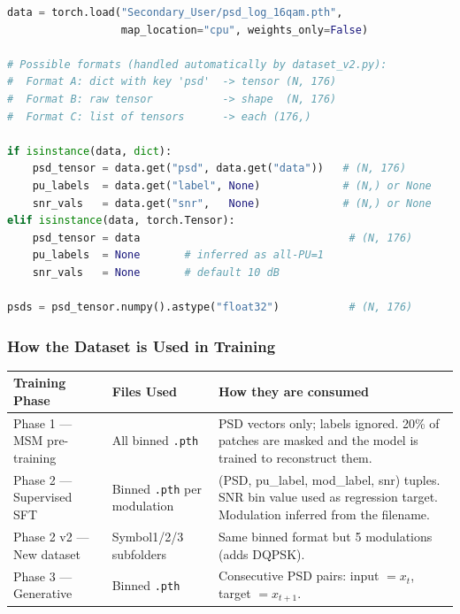 \documentclass[11pt,a4paper]{article}
\begin{document}
\begin{lstlisting}[language=Python, caption=Loading a log-scale .pth file]
data = torch.load("Secondary_User/psd_log_16qam.pth",
                  map_location="cpu", weights_only=False)

# Possible formats (handled automatically by dataset_v2.py):
#  Format A: dict with key 'psd'  -> tensor (N, 176)
#  Format B: raw tensor           -> shape  (N, 176)
#  Format C: list of tensors      -> each (176,)

if isinstance(data, dict):
    psd_tensor = data.get("psd", data.get("data"))   # (N, 176)
    pu_labels  = data.get("label", None)             # (N,) or None
    snr_vals   = data.get("snr",   None)             # (N,) or None
elif isinstance(data, torch.Tensor):
    psd_tensor = data                                 # (N, 176)
    pu_labels  = None       # inferred as all-PU=1
    snr_vals   = None       # default 10 dB

psds = psd_tensor.numpy().astype("float32")           # (N, 176)
\end{lstlisting}

\subsubsection{How the Dataset is Used in Training}

\begin{center}
\renewcommand{\arraystretch}{1.35}
\begin{tabularx}{\textwidth}{l l X}
\toprule
\textbf{Training Phase} & \textbf{Files Used} & \textbf{How they are consumed} \\
\midrule
Phase 1 — MSM pre-training
  & All binned \texttt{.pth}
  & PSD vectors only; labels ignored. 20\% of patches are masked
    and the model is trained to reconstruct them. \\[4pt]
Phase 2 — Supervised SFT
  & Binned \texttt{.pth} per modulation
  & (PSD, pu\_label, mod\_label, snr) tuples.
    SNR bin value used as regression target.
    Modulation inferred from the filename. \\[4pt]
Phase 2 v2 — New dataset
  & Symbol1/2/3 subfolders
  & Same binned format but 5 modulations (adds DQPSK). \\[4pt]
Phase 3 — Generative
  & Binned \texttt{.pth}
  & Consecutive PSD pairs: input $= x_t$, target $= x_{t+1}$. \\
\bottomrule
\end{tabularx}
\end{center}
\end{document}
